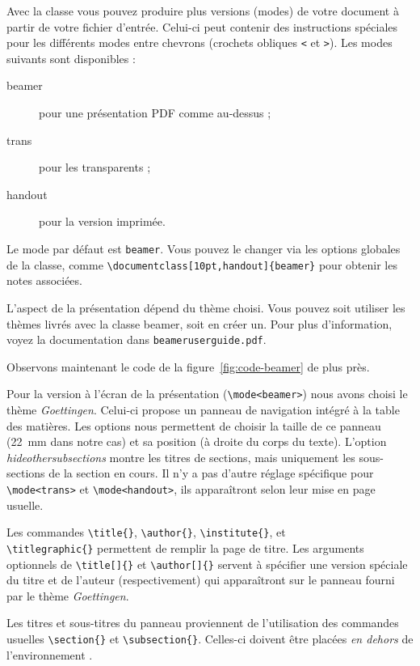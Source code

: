 Avec la classe  vous pouvez produire plus versions (modes)
de votre document à partir de votre fichier d'entrée. Celui-ci peut
contenir des instructions spéciales pour les différents modes entre
chevrons (crochets obliques \verb|<| et \verb|>|). Les modes suivants
sont disponibles :
\begin{description}
\item[beamer] pour une présentation PDF comme au-dessus ;
\item[trans] pour les transparents ;
\item[handout] pour la version imprimée.
\end{description}
Le mode par défaut est \texttt{beamer}. Vous pouvez le changer via les
options globales de la classe, comme
\verb|\documentclass[10pt,handout]{beamer}| pour obtenir les notes
associées.

L'aspect de la présentation dépend du thème choisi. Vous pouvez soit
utiliser les thèmes livrés avec la classe beamer, soit en créer
un. Pour plus d'information, voyez la documentation dans
\texttt{beameruserguide.pdf}.

Observons maintenant le code de la figure~\ref{fig:code-beamer} de
plus près.

Pour la version à l'écran de la présentation (\verb|\mode<beamer>|) nous
avons choisi le thème \emph{Goettingen}. Celui-ci propose un panneau
de navigation intégré à la table des matières. Les options nous permettent
de choisir la taille de ce panneau (22~mm dans notre cas) et sa
position (à droite du corps du texte). L'option
\emph{hideothersubsections} montre les titres de sections, mais
uniquement les sous-sections de la section en cours. Il n'y a pas
d'autre réglage spécifique pour \verb|\mode<trans>| et
\verb|\mode<handout>|, ils apparaîtront selon leur mise en page
usuelle.

Les commandes \verb|\title{}|, \verb|\author{}|, \verb|\institute{}|,
et\\ \verb|\titlegraphic{}| permettent de remplir la page de titre. Les
arguments optionnels de \verb|\title[]{}| et \verb|\author[]{}|
servent à spécifier une version spéciale du titre et de l'auteur
(respectivement) qui apparaîtront sur le panneau fourni par le thème
\emph{Goettingen}.

Les titres et sous-titres du panneau proviennent de l'utilisation des
commandes usuelles \verb|\section{}| et
\verb|\subsection{}|. Celles-ci doivent être placées \emph{en dehors}
de l'environnement .

